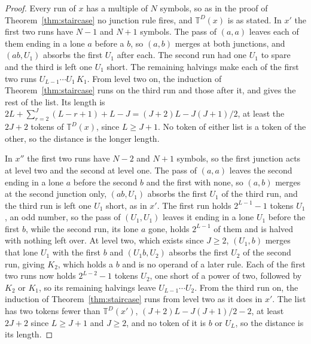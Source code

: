 \documentclass[11pt,a4paper]{article}
\theoremstyle{definition}
\theoremstyle{plain}
\newcommand{\T}{\mathbb{T}}
\begin{document}
\begin{proof}
Every run of \(x\) has a multiple of \(N\) symbols, so as in the proof of Theorem~\ref{thm:staircase} no junction rule
fires, and \(\T^D(x)\) is as stated. In \(x'\) the first two runs have \(N - 1\) and \(N + 1\) symbols. The pass of
\((a, a)\) leaves each of them ending in a lone \(a\) before a \(b\), so \((a, b)\) merges at both junctions, and
\((ab, U_1)\) absorbs the first \(U_1\) after each. The second run had one \(U_1\) to spare and the third is left one
\(U_1\) short. The remaining halvings make each of the first two runs \(U_{L-1} \cdots U_1\,K_1\). From level two on,
the induction of Theorem~\ref{thm:staircase} runs on the third run and those after it, and gives the rest of the list.
Its length is \(2L + \sum_{r=2}^{J}(L - r + 1) + L - J = (J + 2)L - J(J + 1)/2\), at least the \(2J + 2\) tokens of
\(\T^D(x)\), since \(L \ge J + 1\). No token of either list is a token of the other, so the distance is the longer
length.

In \(x''\) the first two runs have \(N - 2\) and \(N + 1\) symbols, so the first junction acts at level two and the
second at level one. The pass of \((a, a)\) leaves the second ending in a lone \(a\) before the second \(b\) and the
first with none, so \((a, b)\) merges at the second junction only, \((ab, U_1)\) absorbs the first \(U_1\) of the third
run, and the third run is left one \(U_1\) short, as in \(x'\). The first run holds \(2^{L-1} - 1\) tokens \(U_1\), an
odd number, so the pass of \((U_1, U_1)\) leaves it ending in a lone \(U_1\) before the first \(b\), while the second
run, its lone \(a\) gone, holds \(2^{L-1}\) of them and is halved with nothing left over. At level two, which exists
since \(J \ge 2\), \((U_1, b)\) merges that lone \(U_1\) with the first \(b\) and \((U_1 b, U_2)\) absorbs the first
\(U_2\) of the second run, giving \(K_2\), which holds a \(b\) and is no operand of a later rule. Each of the first two
runs now holds \(2^{L-2} - 1\) tokens \(U_2\), one short of a power of two, followed by \(K_2\) or \(K_1\), so its
remaining halvings leave \(U_{L-1} \cdots U_2\). From the third run on, the induction of Theorem~\ref{thm:staircase}
runs from level two as it does in \(x'\). The list has two tokens fewer than \(\T^D(x')\),
\((J + 2)L - J(J + 1)/2 - 2\), at least \(2J + 2\) since \(L \ge J + 1\) and \(J \ge 2\), and no token of it is \(b\) or
\(U_L\), so the distance is its length.


\end{proof}
\end{document}
